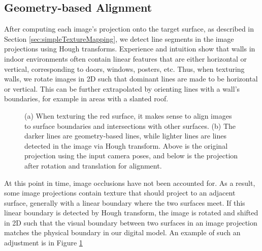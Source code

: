 \documentclass[]{spie}  %
\begin{document}
\subsection{Geometry-based Alignment}
\label{sec:geometryAlignment}
After computing each image's projection onto the target surface, as
described in Section \ref{sec:simpleTextureMapping}, we detect line
segments in the image projections using Hough transforms. Experience
and intuition show that walls in indoor environments often contain
linear features that are either horizontal or vertical, corresponding
to doors, windows, posters, etc. Thus, when texturing walls, we rotate
images in 2D such that dominant lines are made to be horizontal or
vertical. This can be further extrapolated by orienting lines with a
wall's boundaries, for example in areas with a slanted roof.

\begin{figure}
  \centering
  \caption{(a) When texturing the red surface, it makes sense to align
    images to surface boundaries and intersections with other
    surfaces. (b) The darker lines are geometry-based lines, while
    lighter lines are lines detected in the image via Hough
    transform. Above is the original projection using the input camera
    poses, and below is the projection after rotation and translation
    for alignment.}
  \label{fig:geometryAlignment}
\end{figure}


At this point in time, image occlusions have not been accounted
for. As a result, some image projections contain texture that should
project to an adjacent surface, generally with a linear boundary where
the two surfaces meet. If this linear boundary is detected by Hough
transform, the image is rotated and shifted in 2D such that the visual
boundary between two surfaces in an image projection matches the
physical boundary in our digital model. An example of such an
adjustment is in Figure \ref{fig:geometryAlignment}
\end{document}
